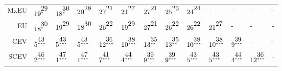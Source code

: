 \documentclass[11pt, a4paper, oneside,final,notitlepage,onecolumn]{article}\usepackage[]{graphicx}\usepackage[]{color}
\begin{document}
\begin{table}[!htb]
\begin{tabular}{rllllllllllll}
  MxEU & $19^{\stackrel{\textstyle29\hfill}{\scriptscriptstyle*\hfill}}$ & $18^{\stackrel{\textstyle30\hfill}{\scriptscriptstyle*\hfill}}$ & $20^{\stackrel{\textstyle28\hfill}{\scriptscriptstyle\hfill}}$ & $27^{\stackrel{\textstyle21\hfill}{\scriptscriptstyle\hfill}}$ & $21^{\stackrel{\textstyle27\hfill}{\scriptscriptstyle\hfill}}$ & $27^{\stackrel{\textstyle21\hfill}{\scriptscriptstyle\hfill}}$ & $25^{\stackrel{\textstyle23\hfill}{\scriptscriptstyle\hfill}}$ & $24^{\stackrel{\textstyle24\hfill}{\scriptscriptstyle\hfill}}$ & - & - & - & - \\ 
  EU & $18^{\stackrel{\textstyle30\hfill}{\scriptscriptstyle*\hfill}}$ & $19^{\stackrel{\textstyle29\hfill}{\scriptscriptstyle\hfill}}$ & $18^{\stackrel{\textstyle30\hfill}{\scriptscriptstyle\hfill}}$ & $26^{\stackrel{\textstyle22\hfill}{\scriptscriptstyle\hfill}}$ & $19^{\stackrel{\textstyle29\hfill}{\scriptscriptstyle\hfill}}$ & $27^{\stackrel{\textstyle21\hfill}{\scriptscriptstyle\hfill}}$ & $26^{\stackrel{\textstyle22\hfill}{\scriptscriptstyle\hfill}}$ & $26^{\stackrel{\textstyle22\hfill}{\scriptscriptstyle\hfill}}$ & $21^{\stackrel{\textstyle27\hfill}{\scriptscriptstyle\hfill}}$ & - & - & - \\ 
  CEV & $5^{\stackrel{\textstyle43\hfill}{\scriptscriptstyle***\hfill}}$ & $5^{\stackrel{\textstyle43\hfill}{\scriptscriptstyle***\hfill}}$ & $5^{\stackrel{\textstyle43\hfill}{\scriptscriptstyle***\hfill}}$ & $12^{\stackrel{\textstyle36\hfill}{\scriptscriptstyle***\hfill}}$ & $10^{\stackrel{\textstyle38\hfill}{\scriptscriptstyle***\hfill}}$ & $13^{\stackrel{\textstyle35\hfill}{\scriptscriptstyle**\hfill}}$ & $13^{\stackrel{\textstyle35\hfill}{\scriptscriptstyle**\hfill}}$ & $10^{\stackrel{\textstyle38\hfill}{\scriptscriptstyle***\hfill}}$ & $10^{\stackrel{\textstyle38\hfill}{\scriptscriptstyle***\hfill}}$ & $9^{\stackrel{\textstyle39\hfill}{\scriptscriptstyle***\hfill}}$ & - & - \\ 
  SCEV & $2^{\stackrel{\textstyle46\hfill}{\scriptscriptstyle***\hfill}}$ & $1^{\stackrel{\textstyle47\hfill}{\scriptscriptstyle***\hfill}}$ & $1^{\stackrel{\textstyle47\hfill}{\scriptscriptstyle***\hfill}}$ & $7^{\stackrel{\textstyle41\hfill}{\scriptscriptstyle***\hfill}}$ & $4^{\stackrel{\textstyle44\hfill}{\scriptscriptstyle***\hfill}}$ & $9^{\stackrel{\textstyle39\hfill}{\scriptscriptstyle***\hfill}}$ & $9^{\stackrel{\textstyle39\hfill}{\scriptscriptstyle***\hfill}}$ & $5^{\stackrel{\textstyle43\hfill}{\scriptscriptstyle***\hfill}}$ & $5^{\stackrel{\textstyle43\hfill}{\scriptscriptstyle***\hfill}}$ & $4^{\stackrel{\textstyle44\hfill}{\scriptscriptstyle***\hfill}}$ & $12^{\stackrel{\textstyle36\hfill}{\scriptscriptstyle***\hfill}}$ & - \\ 

\end{tabular}
\end{table}
\end{document}
